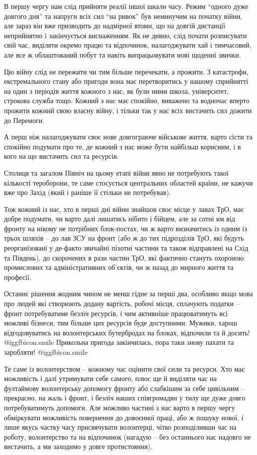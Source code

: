 В першу чергу нам слід прийняти реалії іншої шкали часу. Режим \enquote{одного дуже
довгого дня} та напруги всіх сил \enquote{на ривок} був неминучим на початку війни, але
зараз він вже призводить до надмірної втоми, що на довгій дистанції неприйнятно
і закінчується виснаженням. Як не дивно, слід почати розписувати свій час,
виділяти окремо працю та відпочинок, налагоджувати хай і тимчасовий, але все ж
облаштований побут та навіть випрацьовувати нові щоденні звички.

Цю війну слід не пережити чи тим більше перечекати, а прожити. З катастрофи,
екстремального стану або пригоди вона має перетворитись у нашому сприйнятті на
один з періодів життя кожного з нас, як були ними школа, університет, строкова
служба тощо. Кожний з нас має спокійно, виважено та водночас вперто прожити
кожний свою власну війну, і тільки так у нас всіх вистачить сил дожити до
Перемоги.

А перш ніж налагоджувати своє нове довгограюче військове життя, варто сісти та
спокійно подумати про те, де кожний з нас може бути найбільш корисним, і в кого
на що вистачить сил та ресурсів.

Столиця та загалом Північ на цьому етапі війни явно не потребують такої
кількості тероборони, те  саме стосується центральних областей країни, не
кажучи вже про Захід (який і раніше її стільки не потребував).

Тож кожний із нас, хто в перші дні війни знайшов своє місце у лавах ТрО, має
добре подумати, чи варто далі лишатись нібито і бійцем, але за сотні км від
фронту на нікому не потрібних блок-постах, чи ж варто визначитись із одним із
трьох шляхів – до лав ЗСУ на фронт (або ж до тих підрозділів ТрО, які будуть
реорганізовані у де-факто звичайні піхотні частини та також відправлені на Схід
та Південь), до скорочених в рази частин ТрО, які фактично стануть охороною
промислових та адміністративних об'єктів, чи ж назад до мирного життя та
професії.

Останнє рішення жодним чином не менш гідне за перші два, особливо якщо мова про
людей які створюють додану вартість, робочі місця, сплачують податки – фронт
потребуватиме безліч ресурсів, і чим активніше працюватимуть всі можливі
бізнеси, тим більше цих ресурсів буде доступними. Мужики, харош відгодовуватись
на волонтерських бутербродах на блоках, відпочили та й досить!  @igg{fbicon.smile}  Прикольна
пригода закінчилась, пора таки знову пахати та заробляти!  @igg{fbicon.smile} 

Те саме із волонтерством – кожному час оцінити свої сили та ресурси. Хто має
можливість і далі утримувати себе самого, плюс ще й виділяти час на фултаймову
волонтерську допомогу фронту або слабкішим за себе цивільним – прекрасно, на
жаль і фронт, і безліч наших співгромадян у тилу ще дуже довго потребуватимуть
допомоги. Але можливо частині з нас варто в першу чергу обміркувати можливість
повернення до довоєнної праці, або ж пошуку нової, і лише якусь частку часу
присвячувати волонтерці, чітко розподіливши час на роботу, волонтерство та на
відпочинок (нагадую – без останнього нас надовго не вистачить, а ми заходимо у
довге протистояння).

